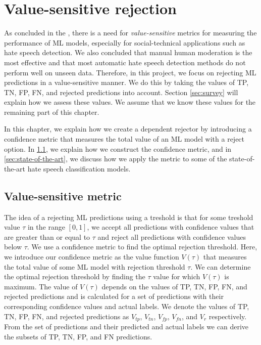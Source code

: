 \chapter{Value-sensitive rejection}
As concluded in the , there is a need for \textit{value-sensitive} metrics for measuring the performance of ML models, especially for social-technical applications such as hate speech detection.
%
We also concluded that manual human moderation is the most effective and that most automatic hate speech detection methods do not perform well on unseen data.
%
Therefore, in this project, we focus on rejecting ML predictions in a value-sensitive manner.
%
We do this by taking the values of TP, TN, FP, FN, and rejected predictions into account.
%
%
Section \ref{sec:survey} will explain how we assess these values.
%
We assume that we know these values for the remaining part of this chapter.
%

%
In this chapter, we explain how we create a dependent rejector by introducing a confidence metric that measures the total value of an ML model with a reject option.
%
In \ref{sec:value-metric}, we explain how we construct the confidence metric, and in \ref{sec:state-of-the-art}, we discuss how we apply the metric to some of the state-of-the-art hate speech classification models.

\section{Value-sensitive metric}
\label{sec:value-metric}
The idea of a rejecting ML predictions using a treshold is that for some treshold value $\tau$ in the range $[0, 1]$, we accept all predictions with confidence values that are greater than or equal to $\tau$ and reject all predictions with confidence values below $\tau$.
%
We use a confidence metric to find the optimal rejection threshold.
%
Here, we introduce our confidence metric as the value function $V(\tau)$ that measures the total value of some ML model with rejection threshold $\tau$.
%
We can determine the optimal rejection threshold by finding the $\tau$ value for which $V(\tau)$ is maximum.
%
The value of $V(\tau)$ depends on the values of TP, TN, FP, FN, and rejected predictions and is calculated for a set of predictions with their corresponding confidence values and actual labels.
%
We denote the values of TP, TN, FP, FN, and rejected predictions as $V_{tp}$, $V_{tn}$, $V_{fp}$, $V_{fn}$, and $V_r$ respectively.
%
From the set of predictions and their predicted and actual labels we can derive the subsets of TP, TN, FP, and FN predictions.
%

